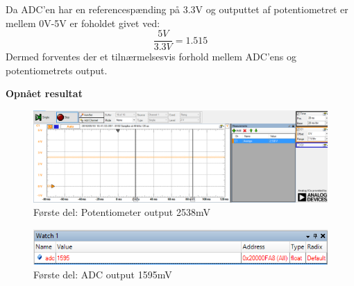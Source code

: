 \noindent Da ADC'en har en referencespænding på 3.3V og outputtet af potentiometret er mellem 0V-5V er foholdet givet ved:
\begin{equation}
\frac {5V} {3.3V}= 1.515
\end{equation}
Dermed forventes der et tilnærmelsesvis forhold mellem ADC'ens og potentiometrets output. \newline

\noindent \textbf{Opnået resultat}
\begin{figure}[H]
	\centering
	\includegraphics[width=\textwidth]{test/images/ModultestADC/2538Vanalog}
	\caption{Første del: Potentiometer output 2538mV}
	\label{figure:analogmid}
\end{figure}
\begin{figure}[H]
	\centering
	\includegraphics[width=\textwidth]{test/images/ModultestADC/mellemDebug}
	\caption{Første del: ADC output 1595mV}
	\label{figure: ADCmid}
\end{figure}




